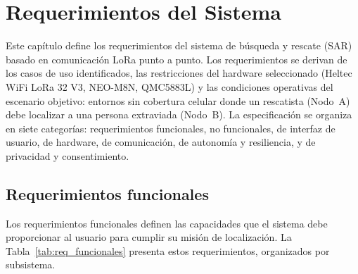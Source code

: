 \chapter{Requerimientos del Sistema}\label{ch:requerimientos}

Este capítulo define los requerimientos del sistema de búsqueda y rescate (SAR) basado en comunicación LoRa punto a punto. Los requerimientos se derivan de los casos de uso identificados, las restricciones del hardware seleccionado (Heltec WiFi LoRa 32 V3, NEO-M8N, QMC5883L) y las condiciones operativas del escenario objetivo: entornos sin cobertura celular donde un rescatista (Nodo~A) debe localizar a una persona extraviada (Nodo~B). La especificación se organiza en siete categorías: requerimientos funcionales, no funcionales, de interfaz de usuario, de hardware, de comunicación, de autonomía y resiliencia, y de privacidad y consentimiento.

\section{Requerimientos funcionales}\label{sec:req_funcionales}

Los requerimientos funcionales definen las capacidades que el sistema debe proporcionar al usuario para cumplir su misión de localización. La Tabla~\ref{tab:req_funcionales} presenta estos requerimientos, organizados por subsistema.

